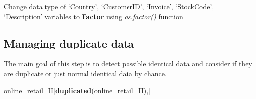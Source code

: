\documentclass[
]{article}
\newenvironment{Shaded}{\begin{snugshade}}{\end{snugshade}}
\newcommand{\KeywordTok}[1]{\textcolor[rgb]{0.13,0.29,0.53}{\textbf{#1}}}
\newcommand{\NormalTok}[1]{#1}
\newcommand{\OperatorTok}[1]{\textcolor[rgb]{0.81,0.36,0.00}{\textbf{#1}}}
\newcommand{\StringTok}[1]{\textcolor[rgb]{0.31,0.60,0.02}{#1}}
\begin{document}
Change data type of `Country', `CustomerID', `Invoice', `StockCode',
`Description' variables to \textbf{Factor} using \emph{as.factor()}
function

\begin{Shaded}
\end{Shaded}

\hypertarget{managing-duplicate-data}{%
\subsection{Managing duplicate data}\label{managing-duplicate-data}}

The main goal of this step is to detect possible identical data and
consider if they are duplicate or just normal identical data by chance.

\begin{Shaded}
\begin{Highlighting}[]
\NormalTok{online_retail_II[}\KeywordTok{duplicated}\NormalTok{(online_retail_II),]}
\end{Highlighting}
\end{Shaded}
\end{document}
